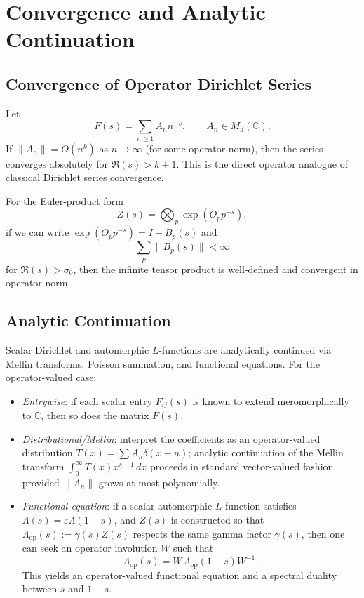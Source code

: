 \documentclass[11pt]{article}
\begin{document}
\section{Convergence and Analytic Continuation}

\subsection{Convergence of Operator Dirichlet Series}

Let
\[
  F(s) = \sum_{n\ge 1} A_n n^{-s}, \qquad A_n \in M_d(\mathbb{C}).
\]
If $\|A_n\| = O(n^k)$ as $n \to \infty$ (for some operator norm), then
the series converges absolutely for $\Re(s) > k+1$. This is the direct
operator analogue of classical Dirichlet series convergence.

For the Euler-product form
\[
  Z(s) = \bigotimes_p \exp(O_p p^{-s}),
\]
if we can write $\exp(O_p p^{-s}) = I + B_p(s)$ and
\[
  \sum_p \|B_p(s)\| < \infty
\]
for $\Re(s) > \sigma_0$, then the infinite tensor product is well-defined
and convergent in operator norm.

\subsection{Analytic Continuation}

Scalar Dirichlet and automorphic $L$-functions are analytically
continued via Mellin transforms, Poisson summation, and functional
equations. For the operator-valued case:

\begin{itemize}
  \item \emph{Entrywise}: if each scalar entry $F_{ij}(s)$ is known to
  extend meromorphically to $\mathbb{C}$, then so does the matrix $F(s)$.
  \item \emph{Distributional/Mellin}: interpret the coefficients as an
  operator-valued distribution $T(x) = \sum A_n \delta(x-n)$; analytic
  continuation of the Mellin transform
  $\int_0^\infty T(x) x^{s-1}\,dx$ proceeds in standard
  vector-valued fashion, provided $\|A_n\|$ grows at most polynomially.
  \item \emph{Functional equation}: if a scalar automorphic $L$-function
  satisfies $\Lambda(s) = \varepsilon \Lambda(1-s)$, and $Z(s)$ is
  constructed so that $\Lambda_{\text{op}}(s) := \gamma(s) Z(s)$
  respects the same gamma factor $\gamma(s)$, then one can seek an
  operator involution $W$ such that
  \[
    \Lambda_{\text{op}}(s)
    = W\,\Lambda_{\text{op}}(1-s)W^{-1}.
  \]
  This yields an operator-valued functional equation and a spectral
  duality between $s$ and $1-s$.
\end{itemize}
\end{document}
